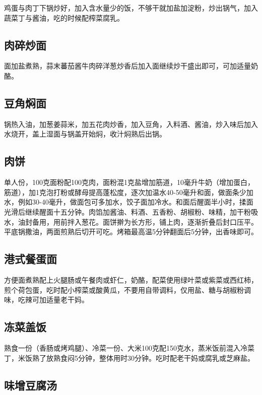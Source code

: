 \documentclass[
  letterpaper,
  DIV=11,
  numbers=noendperiod]{scrreprt}
\begin{document}
鸡蛋与肉丁下锅炒好，加入含水量少的饭，不够干就加盐加淀粉，炒出锅气，加入蔬菜丁与酱油，吃的时候配榨菜腐乳。

\subsection{肉碎炒面}\label{ux8089ux788eux7092ux9762}

面加盐煮熟，蒜末蕃茄酱牛肉碎洋葱炒香后加入面继续炒干盛出即可，可加适量奶酪。

\subsection{豆角焖面}\label{ux8c46ux89d2ux7116ux9762}

锅热入油，加葱姜蒜米，加五花肉炒香，加入豆角，入料酒、酱油，炒入味后加入水烧开，盖上湿面与锅盖开始焖，收汁焖熟后出锅。

\subsection{肉饼}\label{ux8089ux997c}

单人份，100克面粉配100克肉，面粉混1克盐增加筋道，10毫升牛奶（增加蛋白，筋道），加1克泡打粉或酵母提高蓬松度，逐次加温水40-50毫升和面，做面条少加水，例如30-40毫升，做面包可多加水，饺子面加冷水。和面后醒面半小时，揉面光滑后继续醒面十五分钟。肉馅加酱油、料酒、五香粉、胡椒粉、味精，加干粉吸水，油封备用，用前拌入葱花。面饼擀为长方形，铺上肉，逐渐折叠后封口压平。平底锅撒油，两面煎熟后切开可吃。烤箱最高温5分钟翻面后5分钟，出香味即可。

\subsection{港式餐蛋面}\label{ux6e2fux5f0fux9910ux86cbux9762}

方便面煮熟配上火腿肠或午餐肉或虾仁，奶酪，配菜使用绿叶菜或紫菜或西红柿，煎个荷包蛋，吃时配小榨菜或酸黄瓜，不要用自带调料，仅用盐、糖与胡椒粉调味，吃辣可加适量老干妈。

\subsection{冻菜盖饭}\label{ux51bbux83dcux76d6ux996d}

熟食一份（香肠或烤鸡腿）、冷菜一份、大米100克配150克水，蒸米饭前混入冷菜丁，米饭熟了放熟食闷5分钟，整体用时30分钟。吃时配老干妈或腐乳或芝麻盐。

\subsection{味增豆腐汤}\label{ux5473ux589eux8c46ux8150ux6c64}
\end{document}
